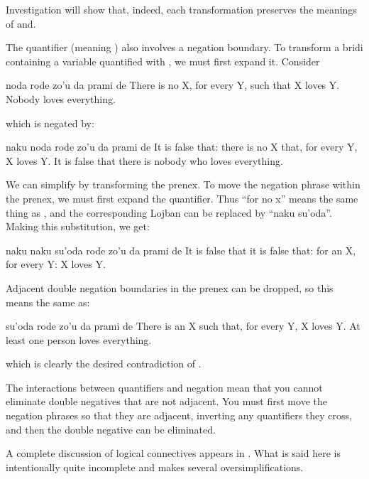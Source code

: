 Investigation will show that, indeed, each transformation
    preserves the meanings of  and. 

The quantifier  (meaning ) also involves a
    negation boundary. To transform a bridi containing a variable
    quantified with , we must first expand it. Consider
\begin{example}
noda rode zo'u da prami de\n
There is no X, for every Y, such that X loves Y.\n
Nobody loves everything.
\end{example}

{\noindent}which is negated by:
\begin{example}
naku noda rode zo'u\n
\T	da prami de\n
It is false that: there is no X that, for every Y,\n
\T	X loves Y.\n
It is false that there is nobody who loves everything.
\end{example}

We can simplify  by
    transforming the prenex. To move the negation phrase within the
    prenex, we must first expand the  quantifier. Thus ``for
    no x'' means the same thing as , and
    the corresponding Lojban  can be replaced by ``naku
    su'oda''. Making this substitution, we get:
\begin{example}
naku naku su'oda rode zo'u\n
\T	da prami de\n
It is false that it is false that: for an X, for every Y:\n
\T	X loves Y.
\end{example}

Adjacent double negation boundaries in the prenex can be
    dropped, so this means the same as:
\begin{example}
su'oda rode zo'u da prami de\n
There is an X such that, for every Y, X loves Y.\n
At least one person loves everything.
\end{example}

{\noindent}which is clearly the desired contradiction of . 

The interactions between quantifiers and negation mean that
    you cannot eliminate double negatives that are not adjacent.
    You must first move the negation phrases so that they are
    adjacent, inverting any quantifiers they cross, and then the
    double negative can be eliminated.



A complete discussion of logical connectives appears in . What is said here is
    intentionally quite incomplete and makes several
    oversimplifications.

